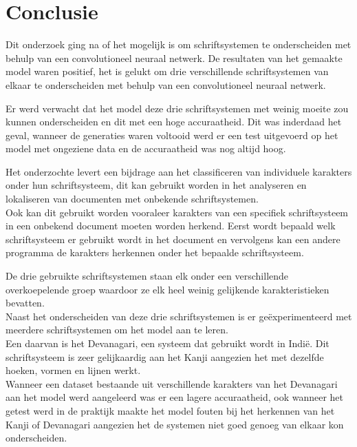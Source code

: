 
\chapter{Conclusie}
\label{ch:conclusie}


Dit onderzoek ging na of het mogelijk is om schriftsystemen te onderscheiden met behulp van een convolutioneel neuraal netwerk.
De resultaten van het gemaakte model waren positief, het is gelukt om drie verschillende schriftsystemen van elkaar te onderscheiden met behulp van een convolutioneel neuraal netwerk.

Er werd verwacht dat het model deze drie schriftsystemen met weinig moeite zou kunnen onderscheiden en dit met een hoge accuraatheid.
Dit was inderdaad het geval, wanneer de generaties waren voltooid werd er een test uitgevoerd op het model met ongeziene data en de accuraatheid was nog altijd hoog.

Het onderzochte levert een bijdrage aan het classificeren van individuele karakters onder hun schriftsysteem, dit kan gebruikt worden in het analyseren en lokaliseren van documenten met onbekende schriftsystemen.\\
Ook kan dit gebruikt worden vooraleer karakters van een specifiek schriftsysteem in een onbekend document moeten worden herkend. Eerst wordt bepaald welk schriftsysteem er gebruikt wordt in het document en vervolgens kan een andere programma de karakters herkennen onder het bepaalde schriftsysteem.

De drie gebruikte schriftsystemen staan elk onder een verschillende overkoepelende groep waardoor ze elk heel weinig gelijkende karakteristieken bevatten. \\
Naast het onderscheiden van deze drie schriftsystemen is er geëxperimenteerd met meerdere schriftsystemen om het model aan te leren.\\
Een daarvan is het Devanagari, een systeem dat gebruikt wordt in Indië.
Dit schriftsysteem is zeer gelijkaardig aan het Kanji aangezien het met dezelfde hoeken, vormen en lijnen werkt.\\
Wanneer een dataset bestaande uit verschillende karakters van het Devanagari aan het model werd aangeleerd was er een lagere accuraatheid, ook wanneer het getest werd in de praktijk maakte het model fouten bij het herkennen van het Kanji of Devanagari aangezien het de systemen niet goed genoeg van elkaar kon onderscheiden.


